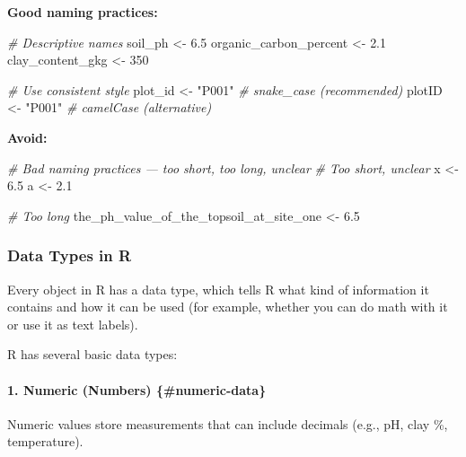 \documentclass[
  10pt,
  b5paper,
  oneside]{book}
\newenvironment{Shaded}{\begin{snugshade}}{\end{snugshade}}
\newcommand{\CommentTok}[1]{\textcolor[rgb]{0.56,0.35,0.01}{\textit{#1}}}
\newcommand{\DecValTok}[1]{\textcolor[rgb]{0.00,0.00,0.81}{#1}}
\newcommand{\FloatTok}[1]{\textcolor[rgb]{0.00,0.00,0.81}{#1}}
\newcommand{\NormalTok}[1]{#1}
\newcommand{\OtherTok}[1]{\textcolor[rgb]{0.56,0.35,0.01}{#1}}
\newcommand{\StringTok}[1]{\textcolor[rgb]{0.31,0.60,0.02}{#1}}
\begin{document}
\textbf{Good naming practices:}

\begin{Shaded}
\begin{Highlighting}[]
\CommentTok{\# Descriptive names}
\NormalTok{soil\_ph }\OtherTok{\textless{}{-}} \FloatTok{6.5}
\NormalTok{organic\_carbon\_percent }\OtherTok{\textless{}{-}} \FloatTok{2.1}
\NormalTok{clay\_content\_gkg }\OtherTok{\textless{}{-}} \DecValTok{350}

\CommentTok{\# Use consistent style}
\NormalTok{plot\_id }\OtherTok{\textless{}{-}} \StringTok{"P001"}      \CommentTok{\# snake\_case (recommended)}
\NormalTok{plotID }\OtherTok{\textless{}{-}} \StringTok{"P001"}       \CommentTok{\# camelCase (alternative)}
\end{Highlighting}
\end{Shaded}

\textbf{Avoid:}

\begin{Shaded}
\begin{Highlighting}[]
\CommentTok{\# Bad naming practices — too short, too long, unclear}
\CommentTok{\# Too short, unclear}
\NormalTok{x }\OtherTok{\textless{}{-}} \FloatTok{6.5}
\NormalTok{a }\OtherTok{\textless{}{-}} \FloatTok{2.1}

\CommentTok{\# Too long}
\NormalTok{the\_ph\_value\_of\_the\_topsoil\_at\_site\_one }\OtherTok{\textless{}{-}} \FloatTok{6.5}
\end{Highlighting}
\end{Shaded}

\subsubsection{Data Types in R}\label{data-types}

Every object in R has a data type, which tells R what kind of information it contains and how it can be used (for example, whether you can do math with it or use it as text labels).

R has several basic data types:

\paragraph*{1. Numeric (Numbers) \{\#numeric-data\}}\label{numeric-numbers-numeric-data}

Numeric values store measurements that can include decimals (e.g., pH, clay \%, temperature).
\end{document}
